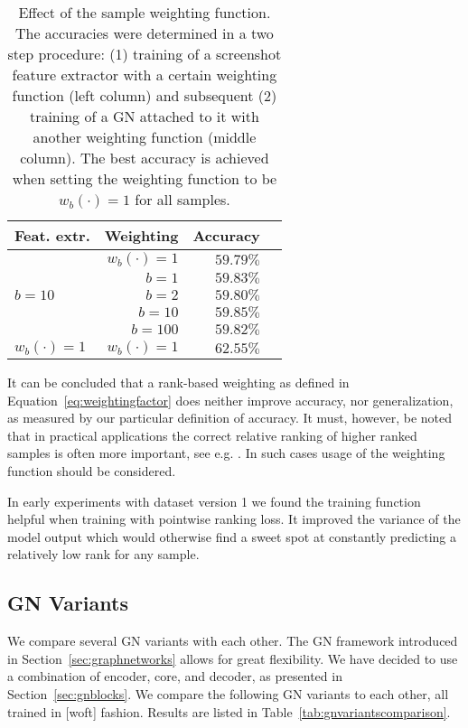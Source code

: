 \begin{table}
    \centering
    \begin{tabular}{lrrr}
        \textbf{Feat. extr.} & \textbf{Weighting} & \textbf{Accuracy}\\\hline
        & $w_b(\cdot)=1$ & $59.79\%$\\
        & $b=1$ & $59.83\%$\\
        $b=10$ & $b=2$ & $59.80\%$\\
        & $b=10$ & $59.85\%$\\
        & $b=100$ & $59.82\%$\\\hline
        $w_b(\cdot)=1$ & $w_b(\cdot)=1$ & $62.55\%$\\
        
    \end{tabular}
    \caption[Effect of the sample weighting function]{Effect of the sample weighting function. The accuracies were determined in a two step procedure: (1) training of a screenshot feature extractor with a certain weighting function (left column) and subsequent (2) training of a GN attached to it with another weighting function (middle column). The best accuracy is achieved when setting the weighting function to be $w_b(\cdot)=1$ for all samples. }
    \label{tab:weightingbase}
\end{table}

It can be concluded that a rank-based weighting as defined in Equation~\ref{eq:weightingfactor} does neither improve accuracy, nor generalization, as measured by our particular definition of accuracy. It must, however, be noted that in practical applications the correct relative ranking of higher ranked samples is often more important, see e.g. \cite{tfranking}. In such cases usage of the weighting function should be considered.

In early experiments with dataset version 1 we found the training function helpful when training with pointwise ranking loss. It improved the variance of the model output which would otherwise find a sweet spot at constantly predicting a relatively low rank for any sample.

\subsection{GN Variants}

We compare several GN variants with each other. The GN framework introduced in Section~\ref{sec:graphnetworks} allows for great flexibility. We have decided to use a combination of encoder, core, and decoder, as presented in Section~\ref{sec:gnblocks}.
We compare the following GN variants to each other, all trained in [woft] fashion. Results are listed in Table~\ref{tab:gnvariantscomparison}.

